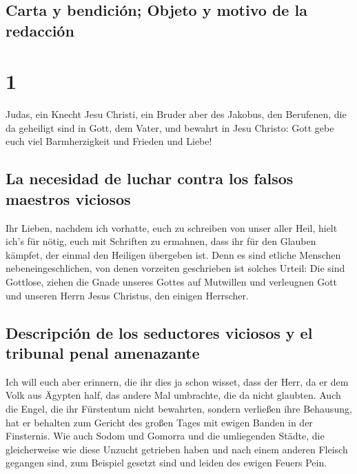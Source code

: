 \hypertarget{carta-y-bendiciuxf3n-objeto-y-motivo-de-la-redacciuxf3n}{%
\subsection{Carta y bendición; Objeto y motivo de la
redacción}\label{carta-y-bendiciuxf3n-objeto-y-motivo-de-la-redacciuxf3n}}

\hypertarget{section}{%
\section{1}\label{section}}

 Judas, ein Knecht Jesu Christi, ein Bruder aber des
Jakobus, den Berufenen, die da geheiligt sind in Gott, dem Vater, und
bewahrt in Jesu Christo:  Gott gebe euch viel
Barmherzigkeit und Frieden und Liebe!

\hypertarget{la-necesidad-de-luchar-contra-los-falsos-maestros-viciosos}{%
\subsection{La necesidad de luchar contra los falsos maestros
viciosos}\label{la-necesidad-de-luchar-contra-los-falsos-maestros-viciosos}}

 Ihr Lieben, nachdem ich vorhatte, euch zu schreiben von
unser aller Heil, hielt ich's für nötig, euch mit Schriften zu ermahnen,
dass ihr für den Glauben kämpfet, der einmal den Heiligen übergeben ist.
 Denn es sind etliche Menschen nebeneingeschlichen, von
denen vorzeiten geschrieben ist solches Urteil: Die sind Gottlose,
ziehen die Gnade unseres Gottes auf Mutwillen und verleugnen Gott und
unseren Herrn Jesus Christus, den einigen Herrscher.

\hypertarget{descripciuxf3n-de-los-seductores-viciosos-y-el-tribunal-penal-amenazante}{%
\subsection{Descripción de los seductores viciosos y el tribunal penal
amenazante}\label{descripciuxf3n-de-los-seductores-viciosos-y-el-tribunal-penal-amenazante}}

 Ich will euch aber erinnern, die ihr dies ja schon
wisset, dass der Herr, da er dem Volk aus Ägypten half, das andere Mal
umbrachte, die da nicht glaubten.  Auch die Engel, die ihr
Fürstentum nicht bewahrten, sondern verließen ihre Behausung, hat er
behalten zum Gericht des großen Tages mit ewigen Banden in der
Finsternis.  Wie auch Sodom und Gomorra und die
umliegenden Städte, die gleicherweise wie diese Unzucht getrieben haben
und nach einem anderen Fleisch gegangen sind, zum Beispiel gesetzt sind
und leiden des ewigen Feuers Pein.

